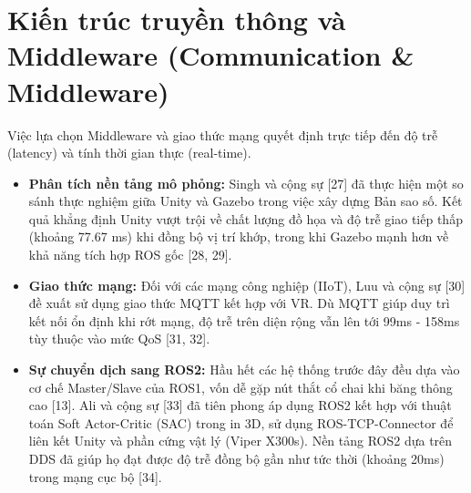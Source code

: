 \section{Kiến trúc truyền thông và Middleware (Communication \& Middleware)}
Việc lựa chọn Middleware và giao thức mạng quyết định trực tiếp đến độ trễ (latency) và tính thời gian thực (real-time). 
\begin{itemize}
    \item \textbf{Phân tích nền tảng mô phỏng:} Singh và cộng sự \cite{singh2025comparative} [27] đã thực hiện một so sánh thực nghiệm giữa Unity và Gazebo trong việc xây dựng Bản sao số. Kết quả khẳng định Unity vượt trội về chất lượng đồ họa và độ trễ giao tiếp thấp (khoảng 77.67 ms) khi đồng bộ vị trí khớp, trong khi Gazebo mạnh hơn về khả năng tích hợp ROS gốc \cite{singh2025comparative} [28, 29].
    \item \textbf{Giao thức mạng:} Đối với các mạng công nghiệp (IIoT), Luu và cộng sự \cite{luu2025enhancing} [30] đề xuất sử dụng giao thức MQTT kết hợp với VR. Dù MQTT giúp duy trì kết nối ổn định khi rớt mạng, độ trễ trên diện rộng vẫn lên tới 99ms - 158ms tùy thuộc vào mức QoS \cite{luu2025enhancing} [31, 32]. 
    \item \textbf{Sự chuyển dịch sang ROS2:} Hầu hết các hệ thống trước đây đều dựa vào cơ chế Master/Slave của ROS1, vốn dễ gặp nút thắt cổ chai khi băng thông cao \cite{zhang2023research} [13]. Ali và cộng sự \cite{ali2025digital} [33] đã tiên phong áp dụng ROS2 kết hợp với thuật toán Soft Actor-Critic (SAC) trong in 3D, sử dụng ROS-TCP-Connector để liên kết Unity và phần cứng vật lý (Viper X300s). Nền tảng ROS2 dựa trên DDS đã giúp họ đạt được độ trễ đồng bộ gần như tức thời (khoảng 20ms) trong mạng cục bộ \cite{ali2025digital} [34]. 
\end{itemize}

